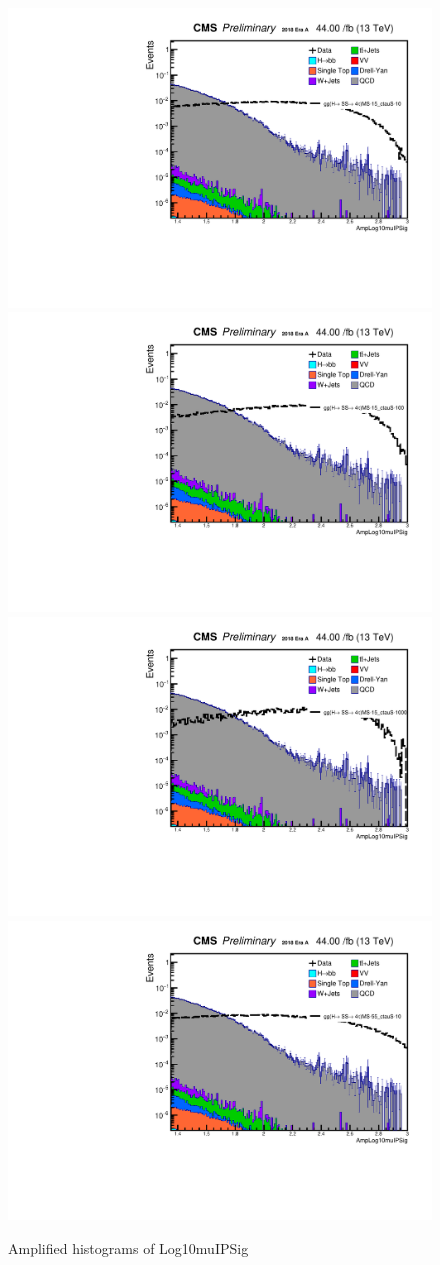  \begin{figure}[h!]
   \caption{Amplified histograms of Log10muIPSig}
   \label{fig:AmpleadmuIP}
   \centering
   \includegraphics[width=0.47\linewidth]{figs/log_AnalysisNote_MS-15_ctauS-10_AmpLog10muIPSig.pdf}
   \includegraphics[width=0.47\linewidth]{figs/log_AnalysisNote_MS-15_ctauS-100_AmpLog10muIPSig.pdf}
   \includegraphics[width=0.47\linewidth]{figs/log_AnalysisNote_MS-15_ctauS-1000_AmpLog10muIPSig.pdf}
   \includegraphics[width=0.47\linewidth]{figs/log_AnalysisNote_MS-55_ctauS-10_AmpLog10muIPSig.pdf}
 \end{figure}

